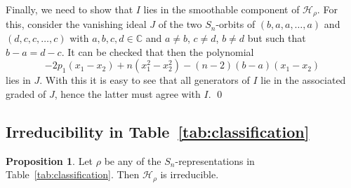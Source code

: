 \documentclass[11pt]{amsart}
\theoremstyle{definition}
\newtheorem{proposition}[theorem]{Proposition}
\newcommand{\CC}{\mathbb{C}}
\newcommand{\HH}{\mathcal{H}}
\begin{document}
Finally, we need to show that $I$ lies in the smoothable component of $\HH_\rho$. For this, consider the vanishing ideal $J$ of the two $S_n$-orbits of $(b,a,a,\ldots,a)$ and $(d,c,c,\ldots,c)$ with $a,b,c,d \in \CC$ and $a \neq b$, $c \neq d$, $b \neq d$ but such that $b-a = d-c$. It can be checked that then the polynomial
\begin{equation*}
    -2 p_1(x_1-x_2) + n(x_1^2 - x_2^2) - (n-2)(b-a)(x_1-x_2)
\end{equation*}
lies in $J$. With this it is easy to see that all generators of $I$ lie in the associated graded of $J$, hence the latter must agree with $I$. \qed


\subsection{Irreducibility in Table~\ref{tab:classification}}

\begin{proposition}
    Let $\rho$ be any of the $S_n$-representations in Table~\ref{tab:classification}. Then $\HH_\rho$ is irreducible. 
\end{proposition}
\end{document}
